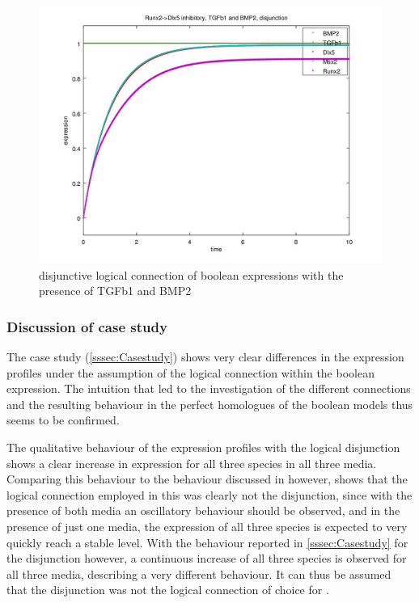 \documentclass[11pt]{article}
\begin{document}
\begin{figure}[!htb]
	\centering
	\includegraphics[scale=0.55]{case6.jpg}
	\caption{\label{sixthCase} disjunctive logical connection of boolean expressions with the presence of TGFb1 and BMP2}
\end{figure}

\subsubsection{Discussion of case study} \label{sssec:Discussioncasestudy}
The case study (\ref{sssec:Casestudy}) shows very clear differences in the expression profiles under the assumption of the logical connection within the boolean expression.
The intuition that led to the investigation of the different connections and the resulting behaviour in the perfect homologues of the boolean models thus seems to be confirmed.

The qualitative behaviour of the expression profiles with the logical disjunction shows a clear increase in expression for all three species in all three media. Comparing this behaviour to the behaviour discussed in \cite{Kirkham} however, shows that the logical connection employed in this was clearly not the disjunction, since with the presence of both media an oscillatory behaviour should be observed, and in the presence of just one media, the expression of all three species is expected to very quickly reach a stable level.
With the behaviour reported in \ref{sssec:Casestudy} for the disjunction however, a continuous increase of all three species is observed for all three media, describing a very different behaviour. It can thus be assumed that the disjunction was not the logical connection of choice for \cite{Kirkham}. \\
\end{document}
